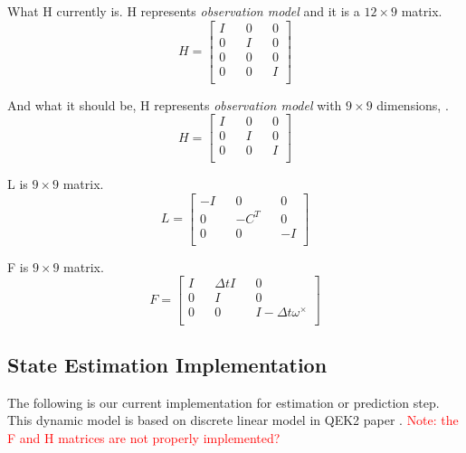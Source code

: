 \documentclass[letterpaper, 10 pt, conference]{ieeeconf}  %
\newcommand{\transpose}[1]{\ensuremath{#1^{\scriptscriptstyle T}}}
\begin{document}
What H currently is.
H represents \textit{observation model} and it is a \(12 \times 9\) matrix.
\begin{equation}
H =
\begin{bmatrix}
        I && 0 && 0  \\
        0 && I && 0  \\
        0 && 0 && 0  \\
        0 && 0 && I  \\
\end{bmatrix}
\end{equation}

And what it should be,
H represents \textit{observation model} with \(9 \times 9\) dimensions,  .
\begin{equation}
H =
\begin{bmatrix}
        I && 0 && 0  \\
        0 && I && 0  \\
        0 && 0 && I  \\
\end{bmatrix}
\end{equation}

L is \(9 \times 9\) matrix.
\begin{equation}
L =
\begin{bmatrix}
        -I && 0 && 0  \\
        0 && -\transpose{C} && 0  \\
        0 && 0 && -I  \\
\end{bmatrix}
\end{equation}


F is \(9 \times 9\) matrix.
\begin{equation}
F =
\begin{bmatrix}
        I && \Delta t   I && 0  \\
        0 && I && 0  \\
        0 && 0 && I- \Delta t \omega^{\times}  \\
\end{bmatrix}
\end{equation}


\subsection{State Estimation Implementation}
The following is our current implementation for estimation or prediction step.
This dynamic model is based on discrete linear model in QEK2 paper
\cite{rotella2014state}.
\textcolor{red}{Note: the F and H matrices are not properly implemented?}
\end{document}
